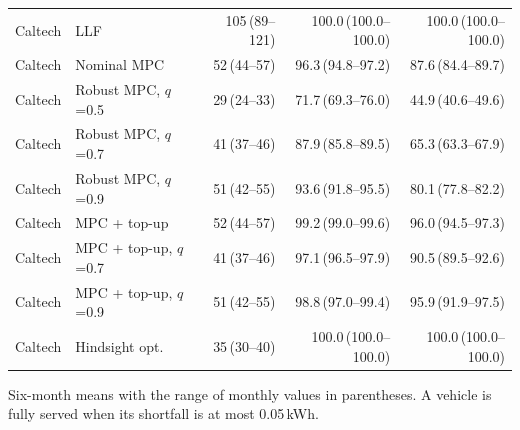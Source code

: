 \begin{table}[!htbp]
\begin{tabular*}{\textwidth}{@{\extracolsep{\fill}}llrrr@{}}
Caltech & LLF & 105\,{\scriptsize(89--121)} & 100.0\,{\scriptsize(100.0--100.0)} & 100.0\,{\scriptsize(100.0--100.0)} \\
Caltech & Nominal MPC & 52\,{\scriptsize(44--57)} & 96.3\,{\scriptsize(94.8--97.2)} & 87.6\,{\scriptsize(84.4--89.7)} \\
Caltech & Robust MPC, $q$=0.5 & 29\,{\scriptsize(24--33)} & 71.7\,{\scriptsize(69.3--76.0)} & 44.9\,{\scriptsize(40.6--49.6)} \\
Caltech & Robust MPC, $q$=0.7 & 41\,{\scriptsize(37--46)} & 87.9\,{\scriptsize(85.8--89.5)} & 65.3\,{\scriptsize(63.3--67.9)} \\
Caltech & Robust MPC, $q$=0.9 & 51\,{\scriptsize(42--55)} & 93.6\,{\scriptsize(91.8--95.5)} & 80.1\,{\scriptsize(77.8--82.2)} \\
Caltech & MPC + top-up & 52\,{\scriptsize(44--57)} & 99.2\,{\scriptsize(99.0--99.6)} & 96.0\,{\scriptsize(94.5--97.3)} \\
Caltech & MPC + top-up, $q$=0.7 & 41\,{\scriptsize(37--46)} & 97.1\,{\scriptsize(96.5--97.9)} & 90.5\,{\scriptsize(89.5--92.6)} \\
Caltech & MPC + top-up, $q$=0.9 & 51\,{\scriptsize(42--55)} & 98.8\,{\scriptsize(97.0--99.4)} & 95.9\,{\scriptsize(91.9--97.5)} \\
Caltech & Hindsight opt. & 35\,{\scriptsize(30--40)} & 100.0\,{\scriptsize(100.0--100.0)} & 100.0\,{\scriptsize(100.0--100.0)} \\
\hline
\end{tabular*}
\par\smallskip\parbox{\textwidth}{\scriptsize Six-month means with the range of monthly values in parentheses. A vehicle is fully served when its shortfall is at most 0.05\,kWh.}
\end{table}
